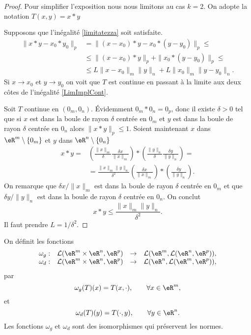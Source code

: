 \begin{proof}
  Pour simplifier l'exposition nous nous limitons au cas $k=2$. On adopte la notation $T(x,y)=x*y$

Supposons que l'inégalité \eqref{limitatezza} soit satisfaite. 
\begin{equation}\label{LimImplCont}
  \begin{aligned}
    \|x*y-x_0*y_0\|_p&=\|(x-x_0)*y-x_0*(y-y_0)\|_p\leq\\
&\leq \|(x-x_0)*y\|_p+\|x_0*(y-y_0)\|_p\leq\\
&\leq L\|x-x_0\|_m\|y\|_n + L\|x_0\|_m\|y-y_0\|_n.
  \end{aligned}
\end{equation}
Si $x\to x_0$ et $y\to y_0$  on voit que $T$ est continue en passant à la limite aux deux côtes de l'inégalité \eqref{LimImplCont}.

Soit $T$ continue en $(0_m,0_n)$. Évidemment $0_m*0_n=0_p$, donc il existe $\delta>0$ tel que si $x$ est dans la boule de rayon $\delta$ centrée en $0_m$ et  $y$ est dans la boule de rayon $\delta$ centrée en $0_n$ alors $\|x*y\|_p\leq 1$. Soient maintenant  $x$ dans $\eR^m\setminus\{ 0_m\}$ et $y$ dans $\eR^n\setminus\{ 0_n\}$
\begin{equation}
  \begin{aligned}
    x*y=&\left(\frac{\|x\|_m}{\delta}\frac{\delta x}{\|x\|_m}\right)*\left(\frac{\|y\|_n}{\delta}\frac{\delta y}{\|y\|_n}\right)=\\
&=\frac{\|x\|_m\|y\|_n}{\delta^2} \left(\frac{\delta x}{\|x\|_m}\right)*\left(\frac{\delta y}{\|y\|_n}\right).
  \end{aligned}
 \end{equation}
On remarque que $\delta x/\|x\|_m$ est dans la boule de rayon $\delta$ centrée en $0_m$ et que $\delta y/\|y\|_n$ est dans la boule de rayon $\delta$ centrée en $0_n$. On conclut 
\[
 x*y\leq \frac{\|x\|_m\|y\|_n}{\delta^2}.
\]
Il faut prendre $L=1/\delta^2$.
\end{proof}
\begin{proposition}\label{isom_isom}
  On définit les fonctions
  \begin{equation}
    \begin{array}{rccc}
      \omega_g: & \mathcal{L}(\eR^{m}\times\eR^{n}, \eR^p)&\to &\mathcal{L}(\eR^{m}, \mathcal{L}(\eR^{n}, \eR^p)),\\
      \omega_d: & \mathcal{L}(\eR^{m}\times\eR^{n}, \eR^p)&\to &\mathcal{L}(\eR^{n}, \mathcal{L}(\eR^{m}, \eR^p)),
    \end{array}
  \end{equation}
par 
\[
\omega_g(T)(x)=T(x,\cdot), \qquad \forall x\in\eR^m,
\]
et
\[
\omega_d(T)(y)=T(\cdot, y), \qquad \forall y\in\eR^n.
\]
Les fonctions $\omega_g$ et $\omega_d$ sont des isomorphismes qui préservent les normes.    
\end{proposition}

